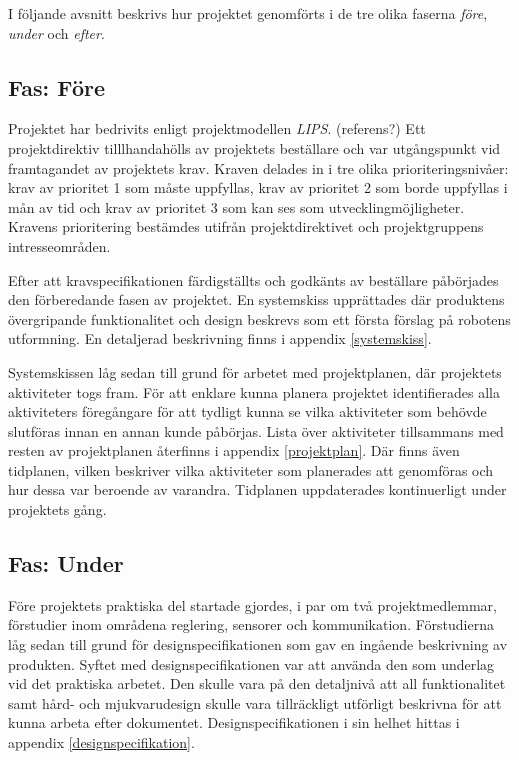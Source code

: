 \documentclass[11pt]{article}
\begin{document}
\begin{flushleft}
I följande avsnitt beskrivs hur projektet genomförts i de tre olika faserna \textit{före}, \textit{under} och \textit{efter}.

\subsection{Fas: Före}
Projektet har bedrivits enligt projektmodellen \textit{LIPS}. (referens?) Ett projektdirektiv tilllhandahölls av projektets beställare och var utgångspunkt vid framtagandet av projektets krav. Kraven delades in i tre olika prioriteringsnivåer: krav av prioritet 1 som måste uppfyllas, krav av prioritet 2 som borde uppfyllas i mån av tid och krav av prioritet 3 som kan ses som utvecklingmöjligheter. Kravens prioritering bestämdes utifrån projektdirektivet och projektgruppens intresseområden. 

Efter att kravspecifikationen färdigställts och godkänts av beställare påbörjades den förberedande fasen av projektet. En systemskiss upprättades där produktens övergripande funktionalitet och design beskrevs som ett första förslag på robotens utformning. En detaljerad beskrivning finns i appendix \ref{systemskiss}. 

Systemskissen låg sedan till grund för arbetet med projektplanen, där projektets aktiviteter togs fram. För att enklare kunna planera projektet identifierades alla aktiviteters föregångare för att tydligt kunna se vilka aktiviteter som behövde slutföras innan en annan kunde påbörjas. Lista över aktiviteter tillsammans med resten av projektplanen återfinns i appendix \ref{projektplan}. Där finns även tidplanen, vilken beskriver vilka aktiviteter som planerades att genomföras och hur dessa var beroende av varandra. Tidplanen uppdaterades kontinuerligt under projektets gång.

\subsection{Fas: Under}
Före projektets praktiska del startade gjordes, i par om två projektmedlemmar, förstudier inom områdena reglering, sensorer och kommunikation. Förstudierna låg sedan till grund för designspecifikationen som gav en ingående beskrivning av produkten. Syftet med designspecifikationen var att använda den som underlag vid det praktiska arbetet. Den skulle vara på den detaljnivå att all funktionalitet samt hård- och mjukvarudesign skulle vara tillräckligt utförligt beskrivna för att kunna arbeta efter dokumentet. Designspecifikationen i sin helhet hittas i appendix \ref{designspecifikation}. 


\end{flushleft}
\end{document}
